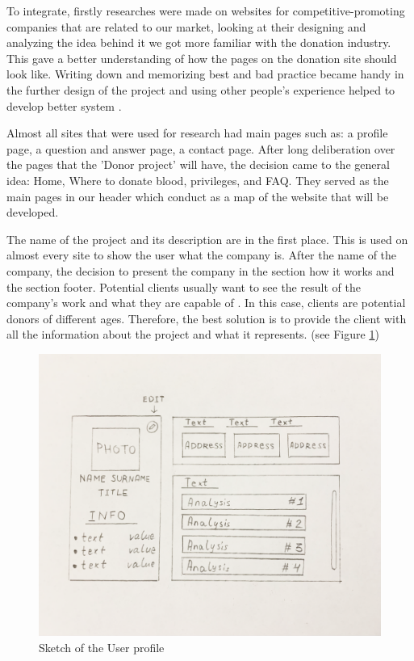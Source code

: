 To integrate, firstly researches were made on websites for competitive-promoting companies that are related to our market, looking at their designing and analyzing the idea behind it we got  more familiar with the donation industry. This gave a better understanding of how the pages on the donation site should look like. Writing down and memorizing best and bad practice became handy in the further design of the project and using other people's experience helped to develop better system \cite{martinez}. 
\par
Almost all sites that were used for research had main pages such as: a profile page, a question and answer page, a contact page.
After long deliberation over the pages that the 'Donor project' will have, the decision came to the general idea: Home, Where to donate blood, privileges, and FAQ. They served as the main pages in our header which conduct as a map of the website that will be developed.
\par
The name of the project and its description are in the first place. This is used on almost every site to show the user what the company is.
After the name of the company, the decision to present the company in the section how it works and the section footer.
Potential clients usually want to see the result of the company's work and what they are capable of \cite{martinez}. In this case, clients are potential donors of different ages. Therefore, the best solution is to provide the client with all the information about the project and what it represents. (see Figure \ref{fig:profilesketch})
\begin{figure}[h]
    \centering
    \includegraphics[scale=0.2]{figures/2.png}
    \caption{Sketch of the User profile}
    \label{fig:profilesketch}
\end{figure}
